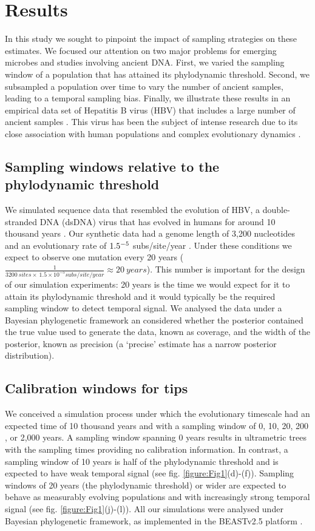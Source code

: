 \documentclass[11pt]{article}
\begin{document}
\section{Results}
In this study we sought to pinpoint the impact of sampling strategies on these estimates. We focused our attention on two major problems for emerging microbes and studies involving ancient DNA. First, we varied the sampling window of a population that has attained its phylodynamic threshold. Second, we subsampled a population over time to vary the number of ancient samples, leading to a temporal sampling bias. Finally, we illustrate these results in an empirical data set of Hepatitis B virus (HBV) that includes a large number of ancient samples \citep{kocher2021ten}. This virus has been the subject of intense research due to its close association with human populations and complex evolutionary dynamics \citep{paraskevis2013dating, ross2018paradox, kahila2012tracing}.

\subsection{Sampling windows relative to the phylodynamic threshold}
We simulated sequence data that resembled the evolution of HBV, a double-stranded DNA (dsDNA) virus that has evolved in humans for around 10 thousand years \citep{kocher2021ten}. Our synthetic data had a genome length of 3,200 nucleotides and an evolutionary rate of $1.5\time10^{-5}$ subs/site/year \citep{kocher2021ten, muhlemann2018ancient}. Under these conditions we expect to observe one mutation every 20 years ($\frac{1}{3200\ sites \times\ 1.5\times10^{-5}subs/site/year}\approx20\ years$). This number is important for the design of our simulation experiments: 20 years is the time we would expect for it to attain its phylodynamic threshold and it would typically be the required sampling window to detect temporal signal. We analysed the data under a Bayesian phylogenetic framework an considered whether the posterior contained the true value used to generate the data, known as coverage, and the width of the posterior, known as precision (a `precise' estimate has a narrow posterior distribution).

\subsection{Calibration windows for tips}
We conceived a simulation process under which the evolutionary timescale had an expected time of 10 thousand years and with a sampling window of 0, 10, 20, 200 , or 2,000 years. A sampling window spanning 0 years results in ultrametric trees with the sampling times providing no calibration information. In contrast, a sampling window of 10 years is half of the phylodynamic threshold and is expected to have weak temporal signal (see fig. \ref{figure:Fig1}(d)-(f)). Sampling windows of 20 years (the phylodynamic threshold) or wider are expected to behave as measurably evolving populations and with increasingly strong temporal signal (see fig. \ref{figure:Fig1}(j)-(l)). All our simulations were analysed under Bayesian phylogenetic framework, as implemented in the BEASTv2.5 platform \citep{bouckaert2019beast}.
\end{document}
